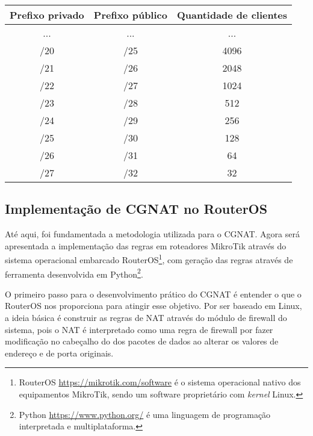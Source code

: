     \begin{quadro}[htb]
        \begin{center}
            \caption{Mapeamento direto entre sub-redes internas/externas usando CGNAT 1:32.} 
            \label{tab:netmap}
            \vspace{0.2cm}
            \footnotesize
            \begin{tabular}{|c|c|c|}
            \hline
            Prefixo privado & Prefixo público & Quantidade de clientes \\
            \hline
            \hline
            ... & ... & ... \\
            /20 & /25 & 4096 \\
            /21 & /26 & 2048 \\
            /22 & /27 & 1024 \\
            /23 & /28 & 512 \\
            /24 & /29 & 256 \\
            /25 & /30 & 128 \\
            /26 & /31 & 64 \\
            /27 & /32 & 32 \\
            \hline 
            \end{tabular}
        \end{center}
    \end{quadro}

\subsection{Implementação de CGNAT no RouterOS}

    Até aqui, foi fundamentada a metodologia utilizada para o CGNAT. Agora será apresentada a implementação das regras em roteadores MikroTik através do sistema operacional embarcado RouterOS\footnote{RouterOS \url{https://mikrotik.com/software} é o sistema operacional nativo dos equipamentos MikroTik, sendo um software proprietário com \textit{kernel} Linux.}, com geração das regras através de ferramenta desenvolvida em Python\footnote{Python \url{https://www.python.org/} é uma linguagem de programação interpretada e multiplataforma.}.
    
    O primeiro passo para o desenvolvimento prático do CGNAT é entender o que o RouterOS nos proporciona para atingir esse objetivo. Por ser baseado em Linux, a ideia básica é construir as regras de NAT através do módulo de firewall do sistema, pois o NAT é interpretado como uma regra de firewall por fazer modificação no cabeçalho do dos pacotes de dados ao alterar os valores de endereço e de porta originais.

